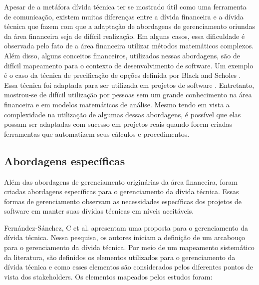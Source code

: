 Apesar de a metáfora dívida técnica ter se mostrado útil como uma ferramenta de comunicação, existem muitas diferenças entre a dívida financeira e a dívida técnica que fazem com que a adaptação de abordagens de gerenciamento oriundas da área financeira seja de difícil realização. Em alguns casos, essa dificuldade é observada pelo fato de a área financeira utilizar métodos matemáticos complexos. Além disso, alguns conceitos financeiros, utilizados nessas abordagens, são de difícil mapeamento para o contexto de desenvolvimento de software. Um exemplo é o caso da técnica de precificação de opções definida por Black and Scholes \cite{chriss1996black}.  Essa técnica foi adaptada para ser utilizada em projetos de software \cite{benaroch1999case,alzaghoul2013cloudmtd,abad2015using}. Entretanto, mostrou-se de difícil utilização por pessoas sem um grande conhecimento na área financeira e em modelos matemáticos de análise. Mesmo tendo em vista a complexidade na utilização de algumas dessas abordagens, é possível que elas possam ser adaptadas com sucesso em projetos reais quando forem criadas ferramentas que automatizem seus cálculos e procedimentos. 


\subsection{Abordagens específicas}


Além das abordagens de gerenciamento originárias da área financeira, foram criadas abordagens  específicas para o gerenciamento da dívida técnica. Essas formas de gerenciamento observam as necessidades específicas dos projetos de software em manter suas dívidas técnicas em níveis aceitáveis.



 Fernández-Sánchez, C et al.\cite{fernandez2015framework} apresentam uma proposta para o gerenciamento da dívida técnica. Nessa pesquisa, os autores iniciam a definição de um arcabouço para o gerenciamento da dívida técnica. Por meio de um mapeamento sistemático da literatura, são definidos os elementos utilizados para o gerenciamento da dívida técnica e como esses elementos são considerados pelos diferentes pontos de vista dos stakeholders. Os elementos mapeados pelos estudos foram:

